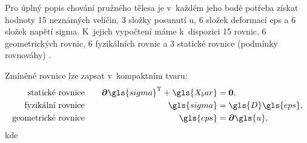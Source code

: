 Pro úplný popis chování pružného tělesa je v~každém jeho bodě potřeba získat hodnoty 15 neznámých veličin, 3 složky posunutí \gls{u}, 6 složek deformací \gls{eps} a 6 složek napětí \gls{sigma}. K~jejich vypočtení máme k~dispozici 15 rovnic, 6 geometrických rovnic, 6 fyzikálních rovnic a 3 statické rovnice (podmínky rovnováhy) \cite[8]{teorie_pruznosti}.

Zmíněné rovnice lze zapsat v~kompaktním tvaru:
\begin{alignat}{2}
    \text{statické~rovnice} \quad && \boldsymbol\partial \gls{sigma}^\mathrm{T} + \gls{X_bar} &= \matr{0}, \label{eq:equilibrium_equations}\\
    \text{fyzikální~rovnice} \quad && \gls{sigma} &= \gls{D} \gls{eps}, \label{eq:constitutive_equations}\\
    \text{geometrické~rovnice} \quad && \gls{eps} &= \boldsymbol\partial{\gls{u}} \label{eq:kinematic_equations},
\end{alignat}
kde
